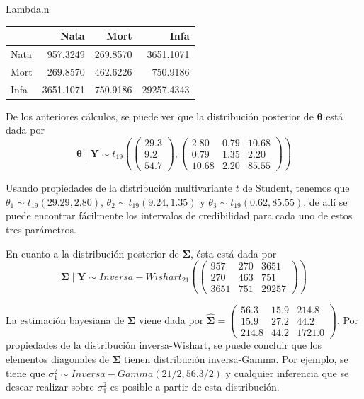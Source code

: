 \documentclass[
  10pt,
  spanish,
]{book}
\newenvironment{Shaded}{\begin{snugshade}}{\end{snugshade}}
\newcommand{\NormalTok}[1]{#1}
\theoremstyle{definition}
\theoremstyle{definition}
\theoremstyle{definition}
\theoremstyle{definition}
\theoremstyle{remark}
\begin{document}
\begin{Shaded}
\begin{Highlighting}[]
\NormalTok{Lambda.n}
\end{Highlighting}
\end{Shaded}

\begin{tabular}{l|r|r|r}
\hline
  & Nata & Mort & Infa\\
\hline
Nata & 957.3249 & 269.8570 & 3651.1071\\
\hline
Mort & 269.8570 & 462.6226 & 750.9186\\
\hline
Infa & 3651.1071 & 750.9186 & 29257.4343\\
\hline
\end{tabular}

De los anteriores cálculos, se puede ver que la distribución posterior de \(\boldsymbol \theta\) está dada por
\begin{equation*}
\boldsymbol \theta\mid\mathbf{Y}\sim t_{19}\left(\begin{pmatrix}29.3\\9.2\\54.7\end{pmatrix}, \begin{pmatrix}2.80&0.79&10.68\\0.79&1.35&2.20\\10.68&2.20&85.55\end{pmatrix}\right)
\end{equation*}

Usando propiedades de la distribución multivariante \(t\) de Student, tenemos que \(\theta_1\sim t_{19}(29.29, 2.80)\), \(\theta_2\sim t_{19}(9.24, 1.35)\) y \(\theta_3\sim t_{19}(0.62, 85.55)\), de allí se puede encontrar fácilmente los intervalos de credibilidad para cada uno de estos tres parámetros.

En cuanto a la distribución posterior de \(\boldsymbol \Sigma\), ésta está dada por
\begin{equation*}
\boldsymbol \Sigma\mid\mathbf{Y}\sim Inversa-Wishart_{21}\left(\begin{pmatrix}957&270&3651\\ 270&463&751\\ 3651&751&29257\end{pmatrix}\right)
\end{equation*}

La estimación bayesiana de \(\boldsymbol \Sigma\) viene dada por \(\hat{\boldsymbol \Sigma}=\begin{pmatrix}56.3&15.9&214.8\\15.9&27.2&44.2\\214.8&44.2&1721.0\end{pmatrix}\). Por propiedades de la distribución inversa-Wishart, se puede concluir que los elementos diagonales de \(\boldsymbol \Sigma\) tienen distribución inversa-Gamma. Por ejemplo, se tiene que \(\sigma^2_{1}\sim Inversa-Gamma(21/2, 56.3/2)\) y cualquier inferencia que se desear realizar sobre \(\sigma^2_{1}\) es posible a partir de esta distribución.
\end{document}
